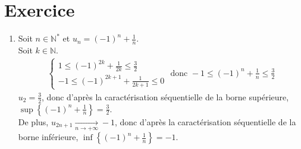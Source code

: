 \documentclass{report}
\begin{document}
\section{Exercice}
\begin{enumerate}
    \item Soit $n \in \mathbb{N}^*$ et $u_n = (-1)^n + \frac{1}{n}$. \\
    Soit $k \in \mathbb{N}$. 
    \begin{align*}
        \begin{cases}
            1 \leq (-1)^{2k} + \frac{1}{2k} \leq \frac{3}{2} \\
            -1 \leq (-1)^{2k+1} + \frac{1}{2k+1} \leq 0
        \end{cases}
        \text{ donc } 
        -1 \leq (-1)^n + \frac{1}{n} \leq \frac{3}{2}
    \end{align*}
    $u_2 = \frac{3}{2}$, donc d'après la caractérisation séquentielle de la borne supérieure, $\sup \left\{ (-1)^n + \frac{1}{n} \right\} = \frac{3}{2}$. \\
    De plus, $u_{2n+1} \underset{n \to +\infty}{\longrightarrow} -1$, donc d'après la caractérisation séquentielle de la borne inférieure, $\inf \left\{ (-1)^n + \frac{1}{n} \right\} = -1$. 
\end{enumerate}
\end{document}
